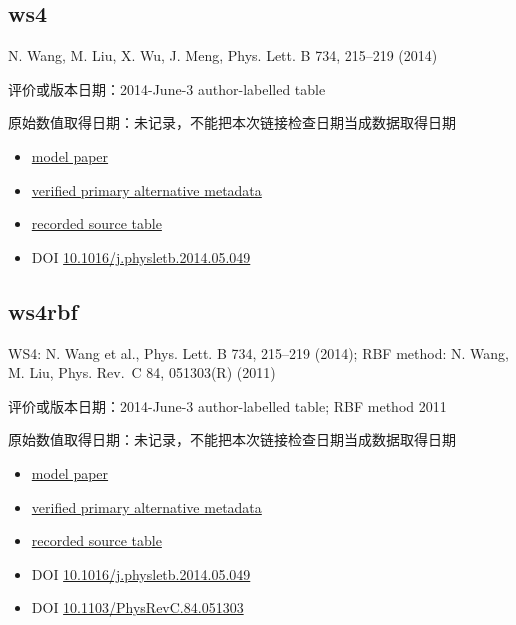 \documentclass[
  11pt,
  letterpaper,
]{article}
\providecommand{\tightlist}{%
  \setlength{\itemsep}{0pt}\setlength{\parskip}{0pt}}
\begin{document}
\subsection{ws4}\label{ws4}

N. Wang, M. Liu, X. Wu, J. Meng, Phys. Lett. B 734, 215--219 (2014)

评价或版本日期：2014-June-3 author-labelled table

原始数值取得日期：未记录，不能把本次链接检查日期当成数据取得日期

\begin{itemize}
\tightlist
\item
  \href{https://doi.org/10.1016/j.physletb.2014.05.049}{model paper}
\item
  \href{https://arxiv.org/abs/1405.2616}{verified primary alternative
  metadata}
\item
  \href{http://www.imqmd.com/mass/}{recorded source table}
\item
  DOI
  \href{https://doi.org/10.1016/j.physletb.2014.05.049}{10.1016/j.physletb.2014.05.049}
\end{itemize}

\subsection{ws4rbf}\label{ws4rbf}

WS4: N. Wang et al., Phys. Lett. B 734, 215--219 (2014); RBF method: N.
Wang, M. Liu, Phys. Rev.~C 84, 051303(R) (2011)

评价或版本日期：2014-June-3 author-labelled table; RBF method 2011

原始数值取得日期：未记录，不能把本次链接检查日期当成数据取得日期

\begin{itemize}
\tightlist
\item
  \href{https://doi.org/10.1016/j.physletb.2014.05.049}{model paper}
\item
  \href{https://journals.aps.org/prc/abstract/10.1103/PhysRevC.84.051303}{verified
  primary alternative metadata}
\item
  \href{http://www.imqmd.com/mass/}{recorded source table}
\item
  DOI
  \href{https://doi.org/10.1016/j.physletb.2014.05.049}{10.1016/j.physletb.2014.05.049}
\item
  DOI
  \href{https://doi.org/10.1103/PhysRevC.84.051303}{10.1103/PhysRevC.84.051303}
\end{itemize}
\end{document}
